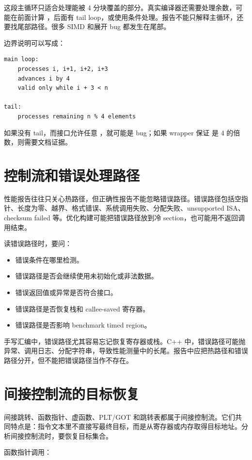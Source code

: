 这段主循环只适合处理能被 4 分块覆盖的部分。真实编译器还需要处理余数，可能在前面计算 ，后面有 tail loop，或使用条件处理。报告不能只解释主循环，还要找尾部路径。很多 SIMD 和展开 bug 都发生在尾部。

边界说明可以写成：

\begin{lstlisting}
main loop:
    processes i, i+1, i+2, i+3
    advances i by 4
    valid only while i + 3 < n

tail:
    processes remaining n % 4 elements
\end{lstlisting}

如果没有 tail，而接口允许任意 ，就可能是 bug；如果 wrapper 保证  是 4 的倍数，则需要文档证据。

\section{控制流和错误处理路径}

性能报告往往只关心热路径，但正确性报告不能忽略错误路径。错误路径包括空指针、长度为零、越界、格式错误、系统调用失败、分配失败、unsupported ISA、checksum failed 等。优化构建可能把错误路径放到冷 section，也可能用不返回调用结束。

读错误路径时，要问：

\begin{itemize}
  \item 错误条件在哪里检测。
  \item 错误路径是否会继续使用未初始化或非法数据。
  \item 错误返回值或异常是否符合接口。
  \item 错误路径是否恢复栈和 callee-saved 寄存器。
  \item 错误路径是否影响 benchmark timed region。
\end{itemize}

手写汇编中，错误路径尤其容易忘记恢复寄存器或栈。C++ 中，错误路径可能抛异常、调用日志、分配字符串，导致性能测量中的长尾。报告中应把热路径和错误路径分开，但不能把错误路径当作不存在。

\section{间接控制流的目标恢复}

间接跳转、函数指针、虚函数、PLT/GOT 和跳转表都属于间接控制流。它们共同特点是：指令文本里不直接写最终目标，而是从寄存器或内存取得目标地址。分析间接控制流时，要恢复目标集合。

函数指针调用：

